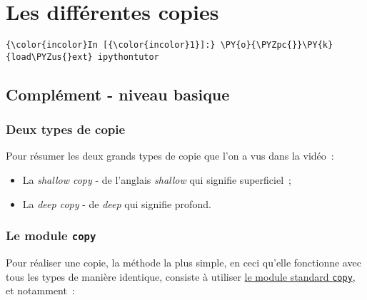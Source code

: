     
    
    
    

    

    \hypertarget{les-diffuxe9rentes-copies}{%
\section{Les différentes copies}\label{les-diffuxe9rentes-copies}}

    \begin{Verbatim}[commandchars=\\\{\},frame=single,framerule=0.3mm,rulecolor=\color{cellframecolor}]
{\color{incolor}In [{\color{incolor}1}]:} \PY{o}{\PYZpc{}}\PY{k}{load\PYZus{}ext} ipythontutor
\end{Verbatim}


    \hypertarget{compluxe9ment---niveau-basique}{%
\subsection{Complément - niveau
basique}\label{compluxe9ment---niveau-basique}}

    \hypertarget{deux-types-de-copie}{%
\subsubsection{Deux types de copie}\label{deux-types-de-copie}}

    Pour résumer les deux grands types de copie que l'on a vus dans la
vidéo~:

\begin{itemize}
\tightlist
\item
  La \emph{shallow copy} - de l'anglais \emph{shallow} qui signifie
  superficiel~;
\item
  La \emph{deep copy} - de \emph{deep} qui signifie profond.
\end{itemize}

    \hypertarget{le-module-copy}{%
\subsubsection{\texorpdfstring{Le module
\texttt{copy}}{Le module copy}}\label{le-module-copy}}

    Pour réaliser une copie, la méthode la plus simple, en ceci qu'elle
fonctionne avec tous les types de manière identique, consiste à utiliser
\href{https://docs.python.org/3/library/copy.html}{le module standard
\texttt{copy}}, et notamment~:


